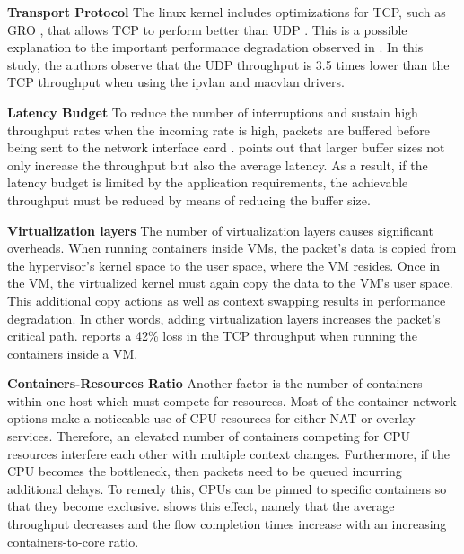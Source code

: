 \documentclass[conference]{IEEEtran}
\begin{document}
\noindent\textbf{Transport Protocol}\hspace{0.2cm} 
The linux kernel includes optimizations for TCP, such as GRO \cite{GRO}, that allows TCP to perform better than UDP \cite{HotConNet_17:Zhao}. This is a possible explanation to the important performance degradation observed in \cite{NOMS_2016:Claasen}. In this study, the authors observe that the UDP throughput is 3.5 times lower than the TCP throughput when using the ipvlan and macvlan drivers.

\noindent\textbf{Latency Budget}\hspace{0.2cm}
To reduce the number of interruptions and sustain high throughput rates when the incoming rate is high, packets are buffered before being sent to the network interface card \cite{DEBS_20:Stylianopoulos}. \cite{ANCS:Gallenmüller} points out that larger buffer sizes not only increase the throughput but also the average latency. As a result, if the latency budget is limited by the application requirements, the achievable throughput must be reduced by means of reducing the buffer size.

\noindent\textbf{Virtualization layers}\hspace{0.2cm}
The number of virtualization layers causes significant overheads. When running containers inside VMs, the packet's data is copied from the hypervisor's kernel space to the user space, where the VM resides. Once in the VM, the virtualized kernel must again copy the data to the VM’s user space. This additional copy actions as well as context swapping results in performance degradation. In other words, adding virtualization layers increases the packet's critical path. \cite{IEEE_INFOCOM_2018:K. Suo} reports a 42\% loss in the TCP throughput when running the containers inside a VM.

\noindent\textbf{Containers-Resources Ratio}\hspace{0.2cm}
Another factor is the number of containers within one host which must compete for resources. Most of the container network options make a noticeable use of CPU resources for either NAT or overlay services. Therefore, an elevated number of containers competing for CPU resources interfere each other with multiple context changes. Furthermore, if the CPU becomes the bottleneck, then packets need to be queued incurring additional delays. To remedy this, CPUs can be pinned to specific containers so that they become exclusive. \cite{Boeira:2021} shows this effect, namely that the average throughput decreases and the flow completion times increase with an increasing containers-to-core ratio. 
\end{document}
